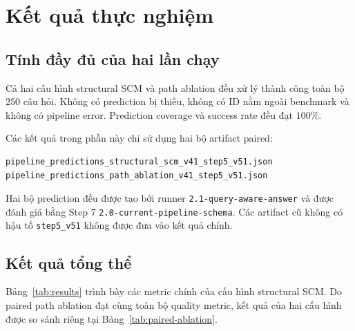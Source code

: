 \section{Kết quả thực nghiệm}
\label{sec:results}

\subsection{Tính đầy đủ của hai lần chạy}

Cả hai cấu hình structural SCM và path ablation đều xử lý thành công toàn bộ
\(250\) câu hỏi. Không có prediction bị thiếu, không có ID nằm ngoài
benchmark và không có pipeline error. Prediction coverage và success rate
đều đạt \(100\%\).

Các kết quả trong phần này chỉ sử dụng hai bộ artifact paired:

\begin{verbatim}
pipeline_predictions_structural_scm_v41_step5_v51.json
pipeline_predictions_path_ablation_v41_step5_v51.json
\end{verbatim}

Hai bộ prediction đều được tạo bởi runner
\texttt{2.1-query-aware-answer} và được đánh giá bằng Step 7
\texttt{2.0-current-pipeline-schema}. Các artifact cũ không có hậu tố
\texttt{step5\_v51} không được đưa vào kết quả chính.

\subsection{Kết quả tổng thể}

Bảng~\ref{tab:results} trình bày các metric chính của cấu hình structural
SCM. Do paired path ablation đạt cùng toàn bộ quality metric, kết quả của
hai cấu hình được so sánh riêng tại
Bảng~\ref{tab:paired-ablation}.


